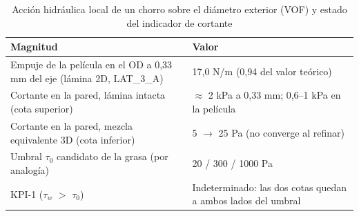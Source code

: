 \begin{table}[htbp]
\centering\small\singlespacing
\caption{Acción hidráulica local de un chorro sobre el diámetro exterior (VOF) y estado del indicador de cortante}
\label{tab:cfd-accion}
\begin{tabularx}{\textwidth}{@{}Yl@{}}
\toprule
\textbf{Magnitud} & \textbf{Valor}\\
\midrule
Empuje de la película en el OD a 0,33 mm del eje (lámina 2D, LAT\_3\_A) & 17,0 N/m (0,94 del valor teórico)\\
Cortante en la pared, lámina intacta (cota superior) & $\approx$ 2 kPa a 0,33 mm; 0,6–1 kPa en la película\\
Cortante en la pared, mezcla equivalente 3D (cota inferior) & 5 $\rightarrow$ 25 Pa (no converge al refinar)\\
Umbral $\tau_0$ candidato de la grasa (por analogía) & 20 / 300 / 1000 Pa\\
KPI-1 ($\tau_w$ $>$ $\tau_0$) & Indeterminado: las dos cotas quedan a ambos lados del umbral\\
\bottomrule
\end{tabularx}
\end{table}

